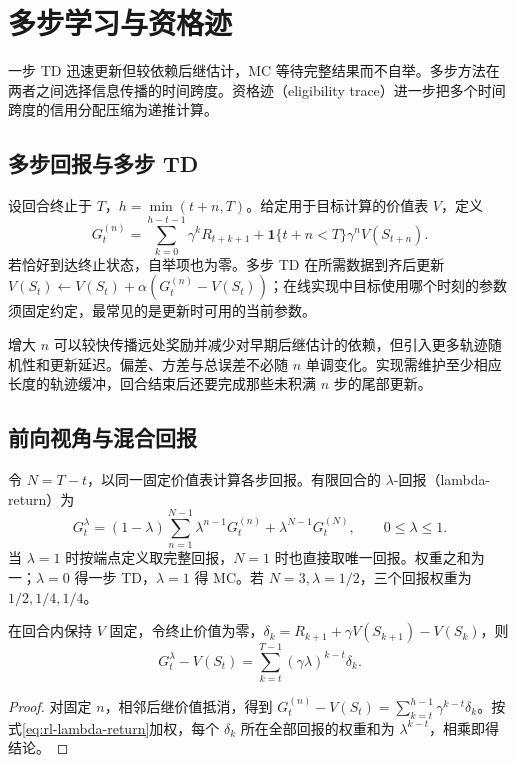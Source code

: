 \setcounter{chapter}{8} %
\chapter{多步学习与资格迹}
\label{ch:rl-multistep}

一步 TD 迅速更新但较依赖后继估计，MC 等待完整结果而不自举。多步方法在两者之间选择信息传播的时间跨度。资格迹（eligibility trace）进一步把多个时间跨度的信用分配压缩为递推计算。

\section{多步回报与多步 TD}

设回合终止于 $T$，$h=\min(t+n,T)$。给定用于目标计算的价值表 $V$，定义
\begin{equation}
G_t^{(n)}=\sum_{k=0}^{h-t-1}\gamma^kR_{t+k+1}
+\mathbf1\{t+n<T\}\gamma^nV(S_{t+n}).
\label{eq:rl-nstep-return}
\end{equation}
若恰好到达终止状态，自举项也为零。多步 TD 在所需数据到齐后更新 $V(S_t)\leftarrow V(S_t)+\alpha(G_t^{(n)}-V(S_t))$；在线实现中目标使用哪个时刻的参数须固定约定，最常见的是更新时可用的当前参数。

增大 $n$ 可以较快传播远处奖励并减少对早期后继估计的依赖，但引入更多轨迹随机性和更新延迟。偏差、方差与总误差不必随 $n$ 单调变化。实现需维护至少相应长度的轨迹缓冲，回合结束后还要完成那些未积满 $n$ 步的尾部更新。

\section{前向视角与混合回报}

令 $N=T-t$，以同一固定价值表计算各步回报。有限回合的 $\lambda$-回报（lambda-return）为
\begin{equation}
G_t^\lambda=(1-\lambda)\sum_{n=1}^{N-1}\lambda^{n-1}G_t^{(n)}
+\lambda^{N-1}G_t^{(N)},\qquad 0\leq\lambda\leq1.
\label{eq:rl-lambda-return}
\end{equation}
当 $\lambda=1$ 时按端点定义取完整回报，$N=1$ 时也直接取唯一回报。权重之和为一；$\lambda=0$ 得一步 TD，$\lambda=1$ 得 MC。若 $N=3,\lambda=1/2$，三个回报权重为 $1/2,1/4,1/4$。

\begin{proposition}[回报误差的残差展开]
在回合内保持 $V$ 固定，令终止价值为零，$\delta_k=R_{k+1}+\gamma V(S_{k+1})-V(S_k)$，则
\[
G_t^\lambda-V(S_t)=\sum_{k=t}^{T-1}(\gamma\lambda)^{k-t}\delta_k.
\]
\end{proposition}
\begin{proof}
对固定 $n$，相邻后继价值抵消，得到 $G_t^{(n)}-V(S_t)=\sum_{k=t}^{h-1}\gamma^{k-t}\delta_k$。按式\eqref{eq:rl-lambda-return}加权，每个 $\delta_k$ 所在全部回报的权重和为 $\lambda^{k-t}$，相乘即得结论。
\end{proof}

